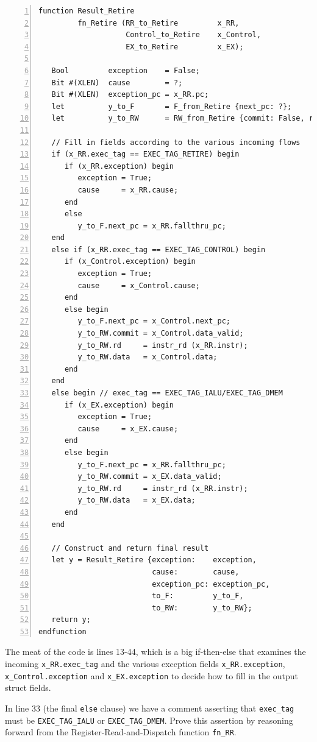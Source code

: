 {\small
\begin{Verbatim}[frame=single, numbers=left]
function Result_Retire
         fn_Retire (RR_to_Retire         x_RR,
                    Control_to_Retire    x_Control,
                    EX_to_Retire         x_EX);

   Bool         exception    = False;
   Bit #(XLEN)  cause        = ?;
   Bit #(XLEN)  exception_pc = x_RR.pc;
   let          y_to_F       = F_from_Retire {next_pc: ?};
   let          y_to_RW      = RW_from_Retire {commit: False, rd: ?, data: ?};

   // Fill in fields according to the various incoming flows
   if (x_RR.exec_tag == EXEC_TAG_RETIRE) begin
      if (x_RR.exception) begin
         exception = True;
         cause     = x_RR.cause;
      end
      else
         y_to_F.next_pc = x_RR.fallthru_pc;
   end
   else if (x_RR.exec_tag == EXEC_TAG_CONTROL) begin
      if (x_Control.exception) begin
         exception = True;
         cause     = x_Control.cause;
      end
      else begin
         y_to_F.next_pc = x_Control.next_pc;
         y_to_RW.commit = x_Control.data_valid;
         y_to_RW.rd     = instr_rd (x_RR.instr);
         y_to_RW.data   = x_Control.data;
      end
   end
   else begin // exec_tag == EXEC_TAG_IALU/EXEC_TAG_DMEM
      if (x_EX.exception) begin
         exception = True;
         cause     = x_EX.cause;
      end
      else begin
         y_to_F.next_pc = x_RR.fallthru_pc;
         y_to_RW.commit = x_EX.data_valid;
         y_to_RW.rd     = instr_rd (x_RR.instr);
         y_to_RW.data   = x_EX.data;
      end
   end

   // Construct and return final result
   let y = Result_Retire {exception:    exception,
                          cause:        cause,
                          exception_pc: exception_pc,
                          to_F:         y_to_F,
                          to_RW:        y_to_RW};
   return y;
endfunction
\end{Verbatim}
}

The meat of the code is lines 13-44, which is a big if-then-else that
examines the incoming \verb|x_RR.exec_tag| and the various exception
fields \verb|x_RR.exception|, \verb|x_Control.exception| and
\verb|x_EX.exception| to decide how to fill in the output struct
fields.

\hdivider

\Exercise

In line 33 (the final \verb|else| clause) we have a comment asserting
that \verb|exec_tag| must be \verb|EXEC_TAG_IALU| or
\verb|EXEC_TAG_DMEM|.  Prove this assertion by reasoning forward from
the Register-Read-and-Dispatch function \verb|fn_RR|.

\Endexercise

